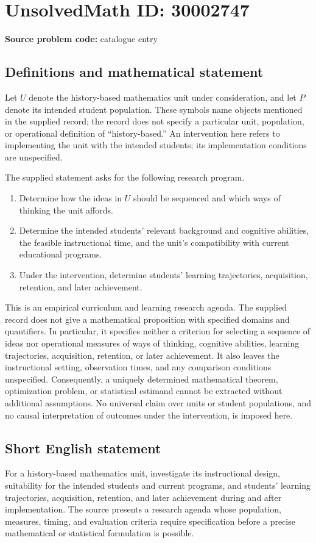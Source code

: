 \documentclass[11pt]{article}
\begin{document}
\section*{UnsolvedMath ID: 30002747}
\textbf{Source problem code:} catalogue entry
\subsection{Definitions and mathematical statement}
Let \(U\) denote the history-based mathematics unit under consideration, and let \(P\) denote its intended student population. These symbols name objects mentioned in the supplied record; the record does not specify a particular unit, population, or operational definition of ``history-based.'' An intervention here refers to implementing the unit with the intended students; its implementation conditions are unspecified.

The supplied statement asks for the following research program.
\begin{enumerate}
\item Determine how the ideas in \(U\) should be sequenced and which ways of thinking the unit affords.
\item Determine the intended students' relevant background and cognitive abilities, the feasible instructional time, and the unit's compatibility with current educational programs.
\item Under the intervention, determine students' learning trajectories, acquisition, retention, and later achievement.
\end{enumerate}

This is an empirical curriculum and learning research agenda. The supplied record does not give a mathematical proposition with specified domains and quantifiers. In particular, it specifies neither a criterion for selecting a sequence of ideas nor operational measures of ways of thinking, cognitive abilities, learning trajectories, acquisition, retention, or later achievement. It also leaves the instructional setting, observation times, and any comparison conditions unspecified. Consequently, a uniquely determined mathematical theorem, optimization problem, or statistical estimand cannot be extracted without additional assumptions. No universal claim over units or student populations, and no causal interpretation of outcomes under the intervention, is imposed here.
\subsection{Short English statement}
For a history-based mathematics unit, investigate its instructional design, suitability for the intended students and current programs, and students' learning trajectories, acquisition, retention, and later achievement during and after implementation. The source presents a research agenda whose population, measures, timing, and evaluation criteria require specification before a precise mathematical or statistical formulation is possible.
\end{document}
